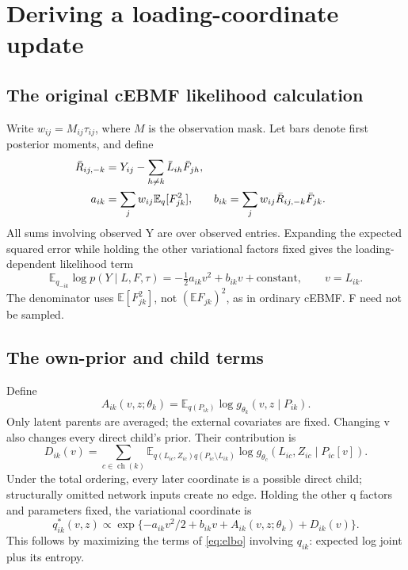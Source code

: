 \documentclass[11pt,a4paper]{article}
\newcommand{\E}{\mathbb E}
\newcommand{\ch}{\operatorname{ch}}
\begin{document}
\clearpage
\section{Deriving a loading-coordinate update}
\subsection{The original cEBMF likelihood calculation}
Write \(w_{ij}=M_{ij}\tau_{ij}\), where \(M\) is the observation mask. Let bars
denote first posterior moments, and define
\begin{align}
\bar R_{ij,-k}&=Y_{ij}-\sum_{h\ne k}\bar L_{ih}\bar F_{jh},\notag\\
a_{ik}&=\sum_jw_{ij}\E_q[F_{jk}^2],&
b_{ik}&=\sum_jw_{ij}\bar R_{ij,-k}\bar F_{jk}.
\label{eq:stats}
\end{align}
All sums involving observed Y are over observed entries. Expanding the
expected squared error while holding the other variational factors fixed
gives the loading-dependent likelihood term
\begin{equation}
\E_{q_{-ik}}\log p(Y\mid L,F,\tau)
=-\tfrac12a_{ik}v^2+b_{ik}v+\text{constant},\qquad v=L_{ik}.
\label{eq:quadratic}
\end{equation}
The denominator uses \(\E[F_{jk}^2]\), not \((\E F_{jk})^2\), as in
ordinary cEBMF. F need not be sampled.

\subsection{The own-prior and child terms}
Define
\begin{equation}
A_{ik}(v,z;\theta_k)=
\E_{q(P_{ik})}\log g_{\theta_k}(v,z\mid P_{ik}).
\label{eq:own}
\end{equation}
Only latent parents are averaged; the external covariates are fixed.
Changing v also changes every direct child's prior. Their contribution is
\begin{equation}
D_{ik}(v)=\sum_{c\in\ch(k)}
\E_{q(L_{ic},Z_{ic})q(P_{ic}\setminus L_{ik})}
\log g_{\theta_c}(L_{ic},Z_{ic}\mid P_{ic}[v]).
\label{eq:child}
\end{equation}
Under the total ordering, every later coordinate is a possible direct
child; structurally omitted network inputs create no edge. Holding the
other q factors and parameters fixed, the variational coordinate is
\begin{equation}
\boxed{q^*_{ik}(v,z)\propto
\exp\{-a_{ik}v^2/2+b_{ik}v+A_{ik}(v,z;\theta_k)+D_{ik}(v)\}.}
\label{eq:qstar}
\end{equation}
This follows by maximizing the terms of \eqref{eq:elbo} involving \(q_{ik}\):
expected log joint plus its entropy.
\end{document}

